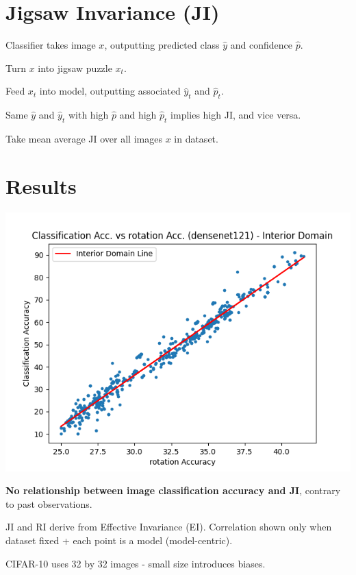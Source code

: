 \documentclass[a4paper]{article}
\begin{document}
{\begin{multicols}{2}
        \section{Jigsaw Invariance (JI)}
        \begin{compactenum}
            \item Classifier takes image \(x\), outputting predicted class \(\hat{y}\) and confidence \(\hat{p}\).
            \item Turn \(x\) into jigsaw puzzle \(x_t\).
            \item Feed \(x_t\) into model, outputting associated \(\hat{y}_t\) and \(\hat{p}_t\).
            \item Same \(\hat{y}\) and \(\hat{y}_t\) with high \(\hat{p}\) and high \(\hat{p}_t\) implies high JI, and vice versa.
            \item Take mean average JI over all images \(x\) in dataset.
        \end{compactenum}
        
        
    \columnbreak
        \section{Results}
        \vspace{-0.3cm}
        \includegraphics[scale=0.44]{images/sample1.png}
        \begin{compactitem}
            \item \textbf{No relationship between image classification accuracy and JI}, contrary to past observations.
            \item JI and RI derive from Effective Invariance (EI). Correlation shown only when dataset fixed + each point is a model (model-centric).
            \item CIFAR-10 uses 32 by 32 images - small size introduces biases.
        \end{compactitem}
        \vspace{-0.4cm}

\end{multicols}}
\end{document}

